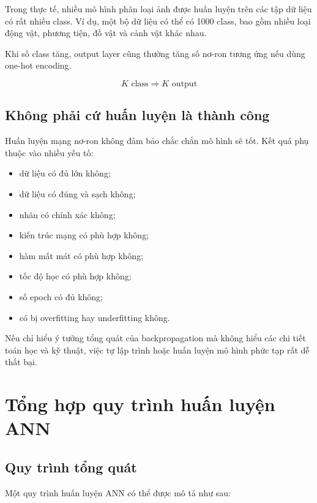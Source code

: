 Trong thực tế, nhiều mô hình phân loại ảnh được huấn luyện trên các tập dữ liệu có rất nhiều class. Ví dụ, một bộ dữ liệu có thể có 1000 class, bao gồm nhiều loại động vật, phương tiện, đồ vật và cảnh vật khác nhau.

Khi số class tăng, output layer cũng thường tăng số nơ-ron tương ứng nếu dùng one-hot encoding.

\[
    K \text{ class} \Rightarrow K \text{ output}
\]

\subsection{Không phải cứ huấn luyện là thành công}

Huấn luyện mạng nơ-ron không đảm bảo chắc chắn mô hình sẽ tốt. Kết quả phụ thuộc vào nhiều yếu tố:

\begin{itemize}
    \item dữ liệu có đủ lớn không;
    \item dữ liệu có đúng và sạch không;
    \item nhãn có chính xác không;
    \item kiến trúc mạng có phù hợp không;
    \item hàm mất mát có phù hợp không;
    \item tốc độ học có phù hợp không;
    \item số epoch có đủ không;
    \item có bị overfitting hay underfitting không.
\end{itemize}

\begin{canhbao}
Nếu chỉ hiểu ý tưởng tổng quát của backpropagation mà không hiểu các chi tiết toán học và kỹ thuật, việc tự lập trình hoặc huấn luyện mô hình phức tạp rất dễ thất bại.
\end{canhbao}

\section{Tổng hợp quy trình huấn luyện ANN}

\subsection{Quy trình tổng quát}

Một quy trình huấn luyện ANN có thể được mô tả như sau:

